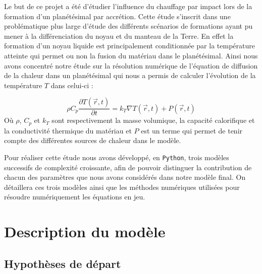 \documentclass[10pt,a4paper]{article}
\numberwithin{equation}{section}
\begin{document}
Le but de ce  projet a été d'étudier l'influence du chauffage par impact lors de la formation d'un planétésimal par accrétion. Cette étude s'inscrit dans une problématique plus large d'étude des différents scénarios de formations ayant pu mener à la différenciation du noyau et du manteau de la Terre. En effet la formation d'un noyau liquide est principalement conditionnée par la température atteinte  qui permet ou non la fusion du matériau dans le planétésimal. Ainsi nous avons concentré notre étude sur la résolution numérique de l'équation de diffusion de la chaleur dans un planétésimal qui nous a permis de calculer l'évolution de la température $T$ dans celui-ci :

\begin{equation}
\rho C_p \frac{\partial T(\vec{r},t)}{\partial t} =  k_{T} \nabla T(\vec{r},t)  + P(\vec{r},t)
\end{equation}
Où $\rho$, $C_p$ et $k_{T}$ sont respectivement la masse volumique, la capacité calorifique et la conductivité thermique du matériau et $P$ est un terme qui permet de tenir compte des différentes sources de chaleur dans le modèle.



Pour réaliser cette étude nous avons développé, en \texttt{Python}, trois modèles successifs  de complexité croissante, afin de pouvoir distinguer la contribution de chacun des paramètres que nous avons considérés dans notre modèle final.
On détaillera ces trois modèles ainsi que les méthodes numériques utilisées pour résoudre numériquement les équations en jeu.


\section{Description du modèle}

\subsection{Hypothèses de départ}
\end{document}
